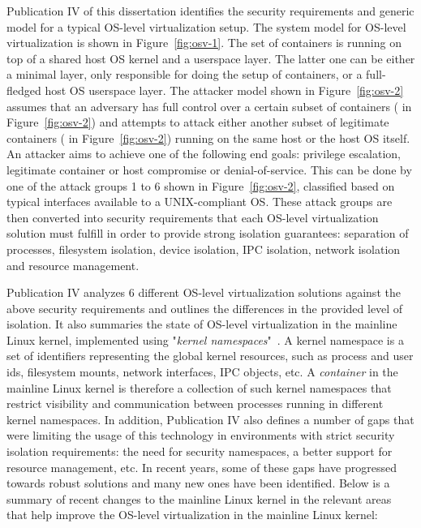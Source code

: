 Publication IV of this dissertation identifies the security requirements and generic model for a typical OS-level virtualization setup.
The system model for OS-level virtualization is shown in Figure~\ref{fig:osv-1}. The set of containers  is running on top of a shared host OS kernel and a userspace layer. The latter one can be either a minimal layer, only responsible for doing the setup of containers, or a full-fledged host OS userspace layer. The attacker model shown in Figure~\ref{fig:osv-2} assumes that an adversary has full control over a certain subset of containers ( in Figure~\ref{fig:osv-2}) and attempts to attack either another subset of legitimate containers ( in Figure~\ref{fig:osv-2}) running on the same host or the host OS itself. An attacker aims to achieve one of the following end goals: privilege escalation, legitimate container or host compromise or denial-of-service. This can be done by one of the attack groups 1 to 6 shown in Figure~\ref{fig:osv-2}, classified based on typical interfaces available to a UNIX-compliant OS. These attack groups are then converted into security requirements that each OS-level virtualization solution must fulfill in order to provide strong isolation guarantees: separation of processes, filesystem isolation, device isolation, IPC isolation, network isolation and resource management.   

Publication IV analyzes 6 different OS-level virtualization solutions against the above security requirements and outlines the differences in the provided level of isolation. It also summaries the state of OS-level virtualization in the mainline Linux kernel, implemented using "\textit{kernel namespaces}"~\cite{biederman2006}. A kernel namespace is a set of identifiers representing the global kernel resources, such as process and user ids, filesystem mounts, network interfaces, IPC objects, etc. A \textit{container} in the mainline Linux kernel is therefore a collection of such kernel namespaces that restrict visibility and communication between processes running in different kernel namespaces. In addition, Publication IV also defines a number of gaps that were limiting the usage of this technology in environments with strict security isolation requirements: the need for security namespaces, a better support for resource management, etc. In recent years, some of these gaps have progressed towards robust solutions and many new ones have been identified. Below is a summary of recent changes to the mainline Linux kernel in the relevant areas that help improve the OS-level virtualization in the mainline Linux kernel:  

